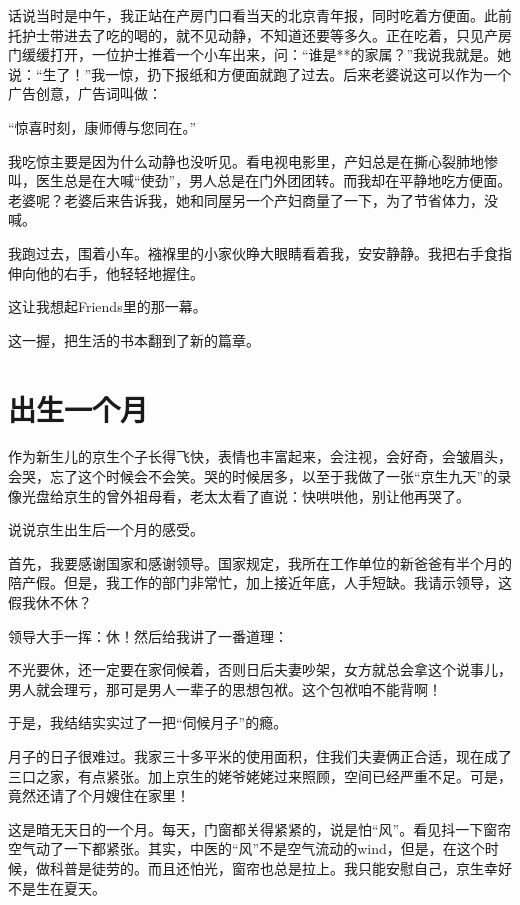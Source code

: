 \documentclass[twoside,openright,headings=optiontohead]{ctexbook} %
\begin{document}
{话说当时是中午，我正站在产房门口看当天的北京青年报，同时吃着方便面。此前托护士带进去了吃的喝的，就不见动静，不知道还要等多久。正在吃着，只见产房门缓缓打开，一位护士推着一个小车出来，问：``谁是**的家属？''我说我就是。她说：``生了！''我一惊，扔下报纸和方便面就跑了过去。后来老婆说这可以作为一个广告创意，广告词叫做：

``惊喜时刻，康师傅与您同在。''

我吃惊主要是因为什么动静也没听见。看电视电影里，产妇总是在撕心裂肺地惨叫，医生总是在大喊``使劲''，男人总是在门外团团转。而我却在平静地吃方便面。老婆呢？老婆后来告诉我，她和同屋另一个产妇商量了一下，为了节省体力，没喊。

我跑过去，围着小车。襁褓里的小家伙睁大眼睛看着我，安安静静。我把右手食指伸向他的右手，他轻轻地握住。

这让我想起Friends里的那一幕。

这一握，把生活的书本翻到了新的篇章。

\chapter*{出生一个月}\label{one-month-young}

作为新生儿的京生个子长得飞快，表情也丰富起来，会注视，会好奇，会皱眉头，会哭，忘了这个时候会不会笑。哭的时候居多，以至于我做了一张``京生九天''的录像光盘给京生的曾外祖母看，老太太看了直说：快哄哄他，别让他再哭了。

说说京生出生后一个月的感受。

首先，我要感谢国家和感谢领导。国家规定，我所在工作单位的新爸爸有半个月的陪产假。但是，我工作的部门非常忙，加上接近年底，人手短缺。我请示领导，这假我休不休？

领导大手一挥：休！然后给我讲了一番道理：

不光要休，还一定要在家伺候着，否则日后夫妻吵架，女方就总会拿这个说事儿，男人就会理亏，那可是男人一辈子的思想包袱。这个包袱咱不能背啊！

于是，我结结实实过了一把``伺候月子''的瘾。

月子的日子很难过。我家三十多平米的使用面积，住我们夫妻俩正合适，现在成了三口之家，有点紧张。加上京生的姥爷姥姥过来照顾，空间已经严重不足。可是，竟然还请了个月嫂住在家里！

这是暗无天日的一个月。每天，门窗都关得紧紧的，说是怕``风''。看见抖一下窗帘空气动了一下都紧张。其实，中医的``风''不是空气流动的wind，但是，在这个时候，做科普是徒劳的。而且还怕光，窗帘也总是拉上。我只能安慰自己，京生幸好不是生在夏天。

}
\end{document}
